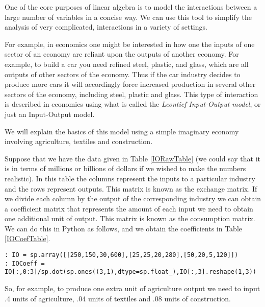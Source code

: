 \label{Leontief}


One of the core purposes of linear algebra is to model the interactions between a large number of variables in a concise way. We can use this tool to simplify the analysis of very complicated, interactions in a variety of settings.

For example, in economics one might be interested in how one the inputs of one sector of an economy are reliant upon the outputs of another economy. For example, to build a car you need refined steel, plastic, and glass, which are all outputs of other sectors of the economy. Thus if the car industry decides to produce more cars it will accordingly force increased production in several other sectors of the economy, including steel, plastic and glass. This type of interaction is described in economics using what is called the \emph{Leontief Input-Output model}, or just an Input-Output model.

We will explain the basics of this model using a simple imaginary economy involving agriculture, textiles and construction.

Suppose that we have the data given in Table \ref{IORawTable} (we could say that it is in terms of millions or billions of dollars if we wished to make the numbers realistic). In this table the columns represent the inputs to a particular industry and the rows represent outputs. This matrix is known as the exchange matrix. If we divide each column by the output of the corresponding industry we can obtain a coefficient matrix that represents the amount of each input we need to obtain one additional unit of output. This matrix is known as the consumption matrix. We can do this in Python as follows, and we obtain the coefficients in Table \ref{IOCoefTable}.

\begin{lstlisting}
: IO = sp.array([[250,150,30,600],[25,25,20,280],[50,20,5,120]])
: IOCoeff = IO[:,0:3]/sp.dot(sp.ones((3,1),dtype=sp.float_),IO[:,3].reshape(1,3))
\end{lstlisting}

So, for example, to produce one extra unit of agriculture output we need to input .4 units of agriculture, .04 units of textiles and .08 units of construction.

